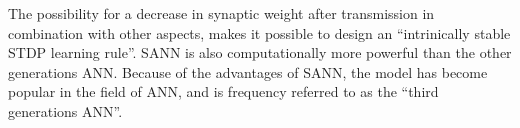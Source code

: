 The possibility for a decrease in synaptic weight after transmission in combination with other aspects, makes it possible to design an ``intrinically stable STDP learning rule''\cite{StableHebbianLearningFromSTDP}.
SANN is also computationally more powerful than the other generations ANN\cite{florian03}.
Because of the advantages of SANN, the model has become popular in the field of ANN, and is frequency referred to as the ``third generations ANN''.








